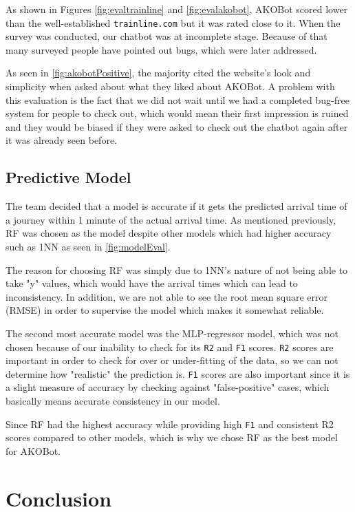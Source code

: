 \documentclass[11pt]{article}
\newcommand{\code}[1]{{\texttt{#1}}}
\begin{document}
    As shown in Figures \ref{fig:evaltrainline} and \ref{fig:evalakobot}, AKOBot scored lower than the well-established \code{trainline.com} but it was rated close to it. When the survey was conducted, our chatbot was at incomplete stage. Because of that many surveyed people have pointed out bugs, which were later addressed.
    
    As seen in \cref{fig:akobotPositive}, the majority cited the website's look and simplicity when asked about what they liked about AKOBot. A problem with this evaluation is the fact that we did not wait until we had a completed bug-free system for people to check out, which would mean their first impression is ruined and they would be biased if they were asked to check out the chatbot again after it was already seen before.
    
    
    
    \subsection{Predictive Model}\label{sec:evalmodel}
    The team decided that a model is accurate if it gets the predicted arrival time of a journey within 1 minute of the actual arrival time. As mentioned previously, RF was chosen as the model despite other models which had higher accuracy such as 1NN as seen in \cref{fig:modelEval}.
    
    The reason for choosing RF was simply due to 1NN's nature of not being able to take "y" values, which would have the arrival times which can lead to inconsistency. In addition, we are not able to see the root mean square error (RMSE) in order to supervise the model which makes it somewhat reliable.
    
    The second most accurate model was the MLP-regressor model, which was not chosen because of our inability to check for its \code{R2} and \code{F1} scores. \code{R2} scores are important in order to check for over or under-fitting of the data, so we can not determine how "realistic" the prediction is. \code{F1} scores are also important since it is a slight measure of accuracy by checking against "false-positive" cases, which basically means accurate consistency in our model.
    
    Since RF had the highest accuracy while providing high \code{F1} and consistent {R2} scores compared to other models, which is why we chose RF as the best model for AKOBot.
    

\section{Conclusion}
\end{document}
